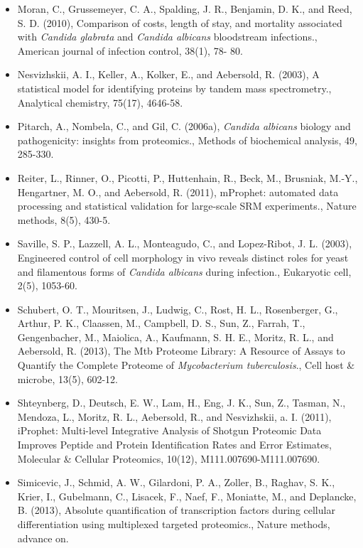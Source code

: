 \begin{itemize}[leftmargin=*]
\item[]{
Moran, C., Grussemeyer, C. A., Spalding, J. R., Benjamin, D. K., and Reed, S. D. (2010),
Comparison of costs, length of stay, and mortality associated with \textit{Candida glabrata} and
\textit{Candida albicans} bloodstream infections., American journal of infection control, 38(1), 78-
80.
}

\item[]{
Nesvizhskii, A. I., Keller, A., Kolker, E., and Aebersold, R. (2003), A statistical model for 
identifying proteins by tandem mass spectrometry., Analytical chemistry, 75(17), 4646-58.
}

\item[]{
Pitarch, A., Nombela, C., and Gil, C. (2006a), \textit{Candida albicans} biology and pathogenicity:
insights from proteomics., Methods of biochemical analysis, 49, 285-330.
}

\item[]{
Reiter, L., Rinner, O., Picotti, P., Huttenhain, R., Beck, M., Brusniak, M.-Y., Hengartner, M. O.,
and Aebersold, R. (2011), mProphet: automated data processing and statistical validation
for large-scale SRM experiments., Nature methods, 8(5), 430-5.
}

\item[]{
Saville, S. P., Lazzell, A. L., Monteagudo, C., and Lopez-Ribot, J. L. (2003), Engineered control
of cell morphology in vivo reveals distinct roles for yeast and filamentous forms of \textit{Candida
albicans} during infection., Eukaryotic cell, 2(5), 1053-60.
}

\item[]{
Schubert, O. T., Mouritsen, J., Ludwig, C., Rost, H. L., Rosenberger, G., Arthur, P. K., Claassen,
M., Campbell, D. S., Sun, Z., Farrah, T., Gengenbacher, M., Maiolica, A., Kaufmann, S. H. E.,
Moritz, R. L., and Aebersold, R. (2013), The Mtb Proteome Library: A Resource of Assays
to Quantify the Complete Proteome of \textit{Mycobacterium tuberculosis}., Cell host \& microbe,
13(5), 602-12.
}

\item[]{
Shteynberg, D., Deutsch, E. W., Lam, H., Eng, J. K., Sun, Z., Tasman, N., Mendoza, L., Moritz,
R. L., Aebersold, R., and Nesvizhskii, a. I. (2011), iProphet: Multi-level Integrative Analysis
of Shotgun Proteomic Data Improves Peptide and Protein Identification Rates and Error
Estimates, Molecular \& Cellular Proteomics, 10(12), M111.007690-M111.007690.
}

\item[]{
Simicevic, J., Schmid, A. W., Gilardoni, P. A., Zoller, B., Raghav, S. K., Krier, I., Gubelmann,
C., Lisacek, F., Naef, F., Moniatte, M., and Deplancke, B. (2013), Absolute quantification
of transcription factors during cellular differentiation using multiplexed targeted proteomics.,
Nature methods, advance on.
}


\end{itemize}

